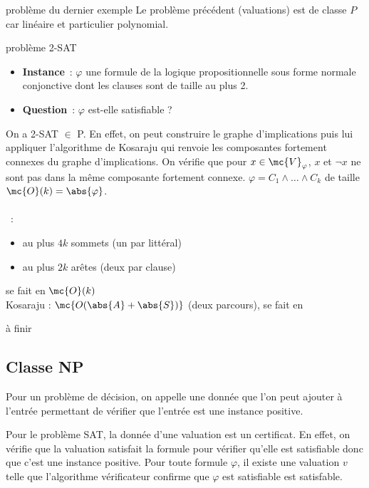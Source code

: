 \begin{adjustwidth}{-3cm}{-3cm}
\begin{exemple}{}{problème du dernier exemple}
    Le problème précédent (valuations) est de classe $P$ car linéaire et particulier polynomial.
\end{exemple}

\begin{exemple}{}{problème 2-SAT}
    \begin{itemize}
        \item \textbf{Instance}~: $\varphi$ une formule de la logique propositionnelle sous forme normale conjonctive dont les clauses sont de taille au plus 2.
        \item \textbf{Question}~: $\varphi$ est-elle satisfiable ?
    \end{itemize}
    On a 2-SAT $\in$ P. En effet, on peut construire le graphe d'implications puis lui appliquer l'algorithme de Kosaraju qui renvoie les composantes fortement connexes du graphe d'implications. On vérifie que pour $x \in \mc{V}_\varphi$, $x$ et $\lnot x$ ne sont pas dans la même composante fortement connexe. $\varphi = C_1 \wedge \dots \wedge C_k$ de taille $\mc{O}(k) = \abs{\varphi}$.\\\\
    ~:
    \begin{itemize}
        \item au plus $4k$ sommets (un par littéral)
        \item au plus $2k$ arêtes (deux par clause)
    \end{itemize}
    se fait en $\mc{O}(k)$\\
    Kosaraju  : $\mc{O(\abs{A} + \abs{S})}$ (deux parcours), se fait en 

    à finir
\end{exemple}

\subsection{Classe NP}

\begin{definition}{}{}
    Pour un problème de décision, on appelle  une donnée que l'on peut ajouter à l'entrée permettant de vérifier que l'entrée est une instance positive.
\end{definition}

\begin{exemple}{}{}
    Pour le problème SAT, la donnée d'une valuation est un certificat. En effet, on vérifie que la valuation satisfait la formule pour vérifier qu'elle est satisfiable donc que c'est une instance positive.
    Pour toute formule $\varphi$, il existe une valuation $v$ telle que l'algorithme vérificateur confirme que $\varphi$ est satisfiable est satisfable.
\end{exemple}


\end{adjustwidth}
